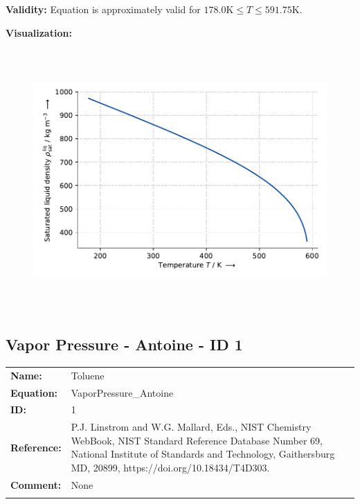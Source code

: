 \textbf{Validity:}
\newline
Equation is approximately valid for $178.0 \si{\kelvin} \leq T \leq 591.75 \si{\kelvin}$.
\newline

\textbf{Visualization:}
%
\begin{figure}[!htp]
{\noindent\includegraphics[height=10cm, keepaspectratio]{figs/ref/ref_Toluene_SaturatedLiquidDensity_EoS1_1.pdf}}
\end{figure}
%

\FloatBarrier
\newpage
\subsection{Vapor Pressure - Antoine - ID 1}
%
\begin{tabular}[l]{|lp{11.5cm}|}
\hline
\addlinespace

\textbf{Name:} & Toluene \\
\textbf{Equation:} & VaporPressure\_Antoine \\
\textbf{ID:} & 1 \\
\textbf{Reference:} & P.J. Linstrom and W.G. Mallard, Eds., NIST Chemistry WebBook, NIST Standard Reference Database Number 69, National Institute of Standards and Technology, Gaithersburg MD, 20899, https://doi.org/10.18434/T4D303. \\
\textbf{Comment:} & None \\

\addlinespace
\hline
\end{tabular}
\newline

